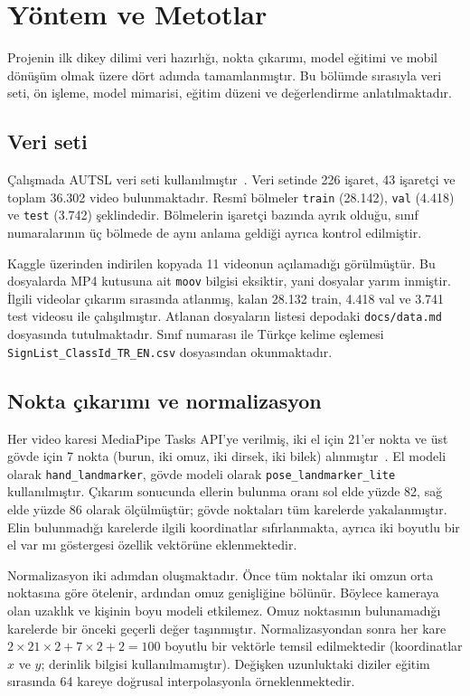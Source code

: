 \section{Yöntem ve Metotlar}
\label{DorduncuBolum}

Projenin ilk dikey dilimi veri hazırlığı, nokta çıkarımı, model eğitimi ve mobil
dönüşüm olmak üzere dört adımda tamamlanmıştır. Bu bölümde sırasıyla veri seti,
ön işleme, model mimarisi, eğitim düzeni ve değerlendirme anlatılmaktadır.

\subsection{Veri seti}

Çalışmada AUTSL veri seti kullanılmıştır~\cite{AUTSL2020}. Veri setinde 226
işaret, 43 işaretçi ve toplam 36.302 video bulunmaktadır. Resmî bölmeler
\texttt{train} (28.142), \texttt{val} (4.418) ve \texttt{test} (3.742) şeklindedir.
Bölmelerin işaretçi bazında ayrık olduğu, sınıf numaralarının üç bölmede de aynı
anlama geldiği ayrıca kontrol edilmiştir.

Kaggle üzerinden indirilen kopyada 11 videonun açılamadığı görülmüştür. Bu
dosyalarda MP4 kutusuna ait \texttt{moov} bilgisi eksiktir, yani dosyalar yarım
inmiştir. İlgili videolar çıkarım sırasında atlanmış, kalan 28.132 train, 4.418
val ve 3.741 test videosu ile çalışılmıştır. Atlanan dosyaların listesi depodaki
\texttt{docs/data.md} dosyasında tutulmaktadır. Sınıf numarası ile Türkçe kelime
eşlemesi \texttt{SignList\_ClassId\_TR\_EN.csv} dosyasından okunmaktadır.

\subsection{Nokta çıkarımı ve normalizasyon}

Her video karesi MediaPipe Tasks API'ye verilmiş, iki el için 21'er nokta ve üst
gövde için 7 nokta (burun, iki omuz, iki dirsek, iki bilek) alınmıştır~\cite{MediaPipe2019}.
El modeli olarak \texttt{hand\_landmarker}, gövde modeli olarak
\texttt{pose\_landmarker\_lite} kullanılmıştır. Çıkarım sonucunda ellerin bulunma
oranı sol elde yüzde 82, sağ elde yüzde 86 olarak ölçülmüştür; gövde noktaları tüm
karelerde yakalanmıştır. Elin bulunmadığı karelerde ilgili koordinatlar
sıfırlanmakta, ayrıca iki boyutlu bir \sol el var mı\sag{} göstergesi özellik
vektörüne eklenmektedir.

Normalizasyon iki adımdan oluşmaktadır. Önce tüm noktalar iki omzun orta noktasına
göre ötelenir, ardından omuz genişliğine bölünür. Böylece kameraya olan uzaklık ve
kişinin boyu modeli etkilemez. Omuz noktasının bulunamadığı karelerde bir önceki
geçerli değer taşınmıştır. Normalizasyondan sonra her kare
$2\times21\times2 + 7\times2 + 2 = 100$ boyutlu bir vektörle temsil edilmektedir
(koordinatlar $x$ ve $y$; derinlik bilgisi kullanılmamıştır). Değişken
uzunluktaki diziler eğitim sırasında 64 kareye doğrusal interpolasyonla
örneklenmektedir.

